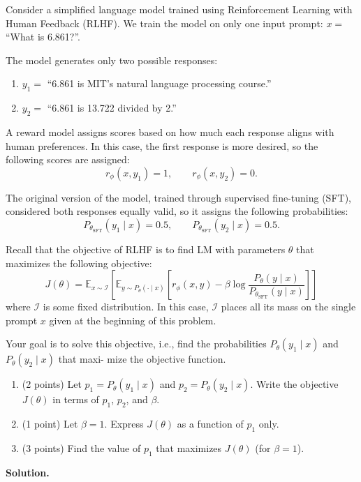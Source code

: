 \documentclass[10pt]{article}
\begin{document}
Consider a simplified language model trained using Reinforcement Learning with Human Feedback
(RLHF). We train the model on only one input prompt: \(x =\) ``What is 6.861?''.

The model generates only two possible responses:
\begin{enumerate}
\item \(y_1 =\) ``6.861 is MIT's natural language processing course.''
\item \(y_2 =\) ``6.861 is 13.722 divided by 2.''
\end{enumerate}

A reward model assigns scores based on how much each response aligns with human preferences.
In this case, the first response is more desired, so the following scores are assigned:
\[
r_\phi(x, y_1)=1,
\qquad
r_\phi(x, y_2)=0.
\]

The original version of the model, trained through supervised fine-tuning (SFT), considered both
responses equally valid, so it assigns the following probabilities:
\[
P_{\theta_{\mathrm{SFT}}}(y_1 \mid x)=0.5,
\qquad
P_{\theta_{\mathrm{SFT}}}(y_2 \mid x)=0.5.
\]

Recall that the objective of RLHF is to find LM with parameters \(\theta\) that maximizes the following
objective:
\[
J(\theta)=
\mathbb{E}_{x \sim \mathcal{I}}
\left[
\mathbb{E}_{y \sim P_\theta(\cdot \mid x)}
\left[
r_\phi(x,y)-\beta \log \frac{P_\theta(y \mid x)}{P_{\theta_{\mathrm{SFT}}}(y \mid x)}
\right]
\right]
\]
where \(\mathcal{I}\) is some fixed distribution. In this case, \(\mathcal{I}\) places all its mass on the single prompt \(x\) given
at the beginning of this problem.

Your goal is to solve this objective, i.e., find the probabilities \(P_\theta(y_1 \mid x)\) and \(P_\theta(y_2 \mid x)\) that maxi-
mize the objective function.

\begin{enumerate}
\item[(a)] (2 points) Let \(p_1 = P_\theta(y_1 \mid x)\) and \(p_2 = P_\theta(y_2 \mid x)\). Write the objective \(J(\theta)\) in terms of \(p_1\), \(p_2\),
and \(\beta\).
\item[(b)] (1 point) Let \(\beta = 1\). Express \(J(\theta)\) as a function of \(p_1\) only.
\item[(c)] (3 points) Find the value of \(p_1\) that maximizes \(J(\theta)\) (for \(\beta = 1\)).
\end{enumerate}

\textbf{Solution.}
\end{document}
